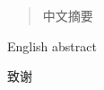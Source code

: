 \documentclass[
    type = bachelor,
    degree = academic,
    twoside,
    fontset = win
]
{njuthesis}
\begin{document}
\maketitle

\begin{abstract}
    中文摘要
\end{abstract}
  
\begin{abstract*}
    English abstract
\end{abstract*}

\tableofcontents

\mainmatter
\cite{DistAI}
\printbibliography

\begin{acknowledgement}
    致谢
\end{acknowledgement}
\end{document}
